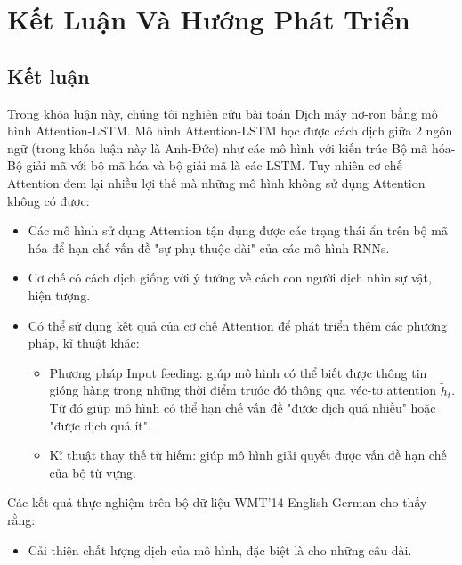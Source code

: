 \chapter{Kết Luận Và Hướng Phát Triển}
\ifpdf
    \graphicspath{{Chapter5/Chapter5Figs/PNG/}{Chapter5/Chapter5Figs/PDF/}{Chapter5/Chapter5Figs/}}
\else
    \graphicspath{{Chapter5/Chapter5Figs/EPS/}{Chapter5/Chapter5Figs/}}
\fi
\label{chap_5}

\section{Kết luận}

Trong khóa luận này, chúng tôi nghiên cứu bài toán Dịch máy nơ-ron bằng mô hình Attention-LSTM. Mô hình Attention-LSTM học được cách dịch giữa 2 ngôn ngữ (trong khóa luận này là Anh-Đức) như các mô hình với kiến trúc Bộ mã hóa-Bộ giải mã với bộ mã hóa và bộ giải mã là các LSTM. Tuy nhiên cơ chế Attention đem lại nhiều lợi thế mà những mô hình không sử dụng Attention không có được:
\begin{itemize}
	\item Các mô hình sử dụng Attention tận dụng được các trạng thái ẩn trên bộ mã hóa để hạn chế vấn đề "sự phụ thuộc dài" của các mô hình RNNs.
	\item Cơ chế có cách dịch giống với ý tưởng về cách con người dịch nhìn sự vật, hiện tượng.
	\item Có thể sử dụng kết quả của cơ chế Attention để phát triển thêm các phương pháp, kĩ thuật khác:
	\begin{itemize}
		\item Phương pháp Input feeding: giúp mô hình có thể biết được thông tin gióng hàng trong những thời điểm trước đó thông qua véc-tơ attention $\tilde{h}_t$. Từ đó giúp mô hình có thể hạn chế vấn đề "đươc dịch quá nhiều" hoặc "được dịch quá ít".
		\item Kĩ thuật thay thế từ hiếm: giúp mô hình giải quyết được vấn đề hạn chế của bộ từ vựng.
	\end{itemize}
\end{itemize}

Các kết quả thực nghiệm trên bộ dữ liệu WMT'14 English-German cho thấy rằng:
\begin{itemize}
	\item Cải thiện chất lượng dịch của mô hình, đặc biệt là cho những câu dài.
\end{itemize}



